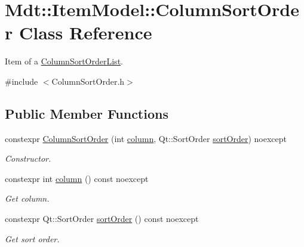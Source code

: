\hypertarget{class_mdt_1_1_item_model_1_1_column_sort_order}{}\section{Mdt\+:\+:Item\+Model\+:\+:Column\+Sort\+Order Class Reference}
\label{class_mdt_1_1_item_model_1_1_column_sort_order}


Item of a \hyperlink{class_mdt_1_1_item_model_1_1_column_sort_order_list}{Column\+Sort\+Order\+List}.  




{\ttfamily \#include $<$Column\+Sort\+Order.\+h$>$}

\subsection*{Public Member Functions}
\begin{DoxyCompactItemize}
\item 
constexpr \hyperlink{class_mdt_1_1_item_model_1_1_column_sort_order_ae5dabb106b5e3d1aa4a22908ad623989}{Column\+Sort\+Order} (int \hyperlink{class_mdt_1_1_item_model_1_1_column_sort_order_a0b25cf7cab268fec40905c301c5774cb}{column}, Qt\+::\+Sort\+Order \hyperlink{class_mdt_1_1_item_model_1_1_column_sort_order_a7ae12f204025cecd1f1f5763cfcf0705}{sort\+Order}) noexcept
\begin{DoxyCompactList}\small\item\em Constructor. \end{DoxyCompactList}\item 
constexpr int \hyperlink{class_mdt_1_1_item_model_1_1_column_sort_order_a0b25cf7cab268fec40905c301c5774cb}{column} () const noexcept\hypertarget{class_mdt_1_1_item_model_1_1_column_sort_order_a0b25cf7cab268fec40905c301c5774cb}{}\label{class_mdt_1_1_item_model_1_1_column_sort_order_a0b25cf7cab268fec40905c301c5774cb}

\begin{DoxyCompactList}\small\item\em Get column. \end{DoxyCompactList}\item 
constexpr Qt\+::\+Sort\+Order \hyperlink{class_mdt_1_1_item_model_1_1_column_sort_order_a7ae12f204025cecd1f1f5763cfcf0705}{sort\+Order} () const noexcept\hypertarget{class_mdt_1_1_item_model_1_1_column_sort_order_a7ae12f204025cecd1f1f5763cfcf0705}{}\label{class_mdt_1_1_item_model_1_1_column_sort_order_a7ae12f204025cecd1f1f5763cfcf0705}

\begin{DoxyCompactList}\small\item\em Get sort order. \end{DoxyCompactList}\end{DoxyCompactItemize}



